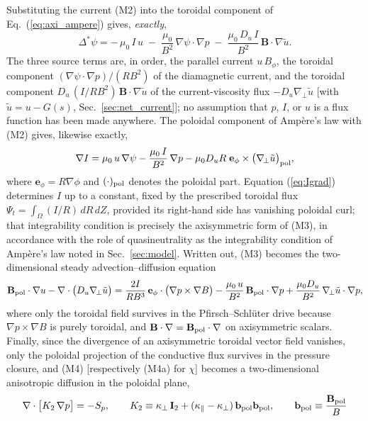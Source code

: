 \documentclass[english]{article}
\newcommand{\bB}{\mathbf{B}}
\newcommand{\bb}{\mathbf{b}}
\newcommand{\bI}{\mathbf{I}}
\newcommand{\gradperp}{\nabla_{\!\perp}}
\begin{document}
Substituting the current (M2) into the toroidal component of Eq.~(\ref{eq:axi_ampere}) gives,
\emph{exactly},
\begin{equation}
\boxed{\;
\Delta^*\psi
=-\,\mu_0\,I\,u
\;-\;\frac{\mu_0}{B^{2}}\,\nabla\psi\cdot\nabla p
\;-\;\frac{\mu_0\,D_u\,I}{B^{2}}\,\bB\cdot\nabla\tilde u .
\;}
\label{eq:GSgen}
\end{equation}
The three source terms are, in order, the parallel current $u\,B_\phi$, the toroidal component
$(\nabla\psi\cdot\nabla p)/(RB^{2})$ of the diamagnetic current, and the toroidal component
$D_u\,(I/RB^{2})\,\bB\cdot\nabla\tilde u$ of the current-viscosity flux $-D_u\gradperp\tilde u$
[with $\tilde u=u-G(s)$, Sec.~\ref{sec:net_current}]; no assumption that $p$, $I$, or $u$ is a flux
function has been made anywhere. The poloidal component of
Amp\`ere's law with (M2) gives, likewise exactly,
\begin{equation}
\nabla I=\mu_0\,u\,\nabla\psi-\frac{\mu_0\,I}{B^{2}}\,\nabla p
-\mu_0 D_u R\;\mathbf{e}_\phi\times\big(\gradperp\tilde u\big)_{\rm pol} ,
\label{eq:Igrad}
\end{equation}
where $\mathbf{e}_\phi=R\nabla\phi$ and $(\cdot)_{\rm pol}$ denotes the poloidal part. Equation
(\ref{eq:Igrad}) determines $I$ up to a constant, fixed by the prescribed toroidal flux
$\Psi_t=\int_\Omega(I/R)\,dR\,dZ$, provided its right-hand side has vanishing poloidal curl; that
integrability condition is precisely the axisymmetric form of (M3), in accordance with the role of
quasineutrality as the integrability condition of Amp\`ere's law noted in Sec.~\ref{sec:model}.
Written out, (M3) becomes the two-dimensional steady advection--diffusion equation
\begin{equation}
\bB_{\rm pol}\cdot\nabla u-\nabla\cdot\big(D_u\gradperp\tilde u\big)
=\frac{2I}{RB^{3}}\,\mathbf{e}_\phi\cdot\big(\nabla p\times\nabla B\big)
-\frac{\mu_0\,u}{B^{2}}\,\bB_{\rm pol}\cdot\nabla p
+\frac{\mu_0 D_u}{B^{2}}\,\gradperp\tilde u\cdot\nabla p ,
\label{eq:axi_M3}
\end{equation}
where only the toroidal field survives in the Pfirsch--Schl\"uter drive because
$\nabla p\times\nabla B$ is purely toroidal, and $\bB\cdot\nabla=\bB_{\rm pol}\cdot\nabla$ on
axisymmetric scalars. Finally, since the divergence of an axisymmetric toroidal vector field
vanishes, only the poloidal projection of the conductive flux survives in the pressure closure,
and (M4) [respectively (M4a) for $\chi$] becomes a two-dimensional anisotropic diffusion in the
poloidal plane,
\begin{equation}
\nabla\cdot\big[K_{2}\,\nabla p\big]=-S_p ,
\qquad
K_{2}\equiv\kappa_\perp\,\bI_{2}+(\kappa_\parallel-\kappa_\perp)\,\bb_{\rm pol}\bb_{\rm pol} ,
\qquad \bb_{\rm pol}\equiv\frac{\bB_{\rm pol}}{B}
\label{eq:axi_M4}
\end{equation}
\end{document}
